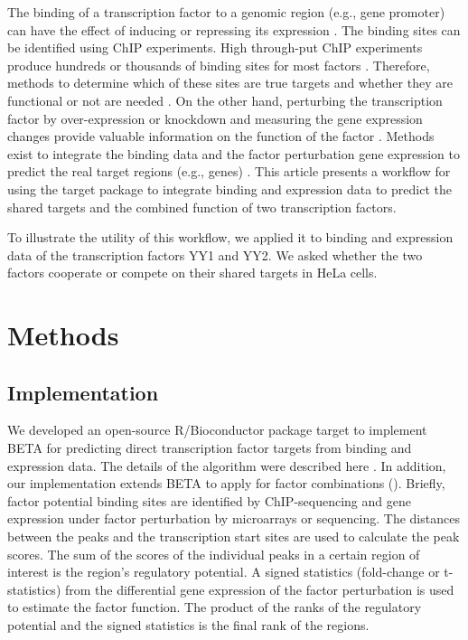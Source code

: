 \documentclass[9pt,a4paper,]{extarticle}
\begin{document}
The binding of a transcription factor to a genomic region (e.g., gene promoter) can have the effect of inducing or repressing its expression \citet{Latchman2001}. The binding sites can be identified using ChIP experiments. High through-put ChIP experiments produce hundreds or thousands of binding sites for most factors \citet{Johnson2007a}. Therefore, methods to determine which of these sites are true targets and whether they are functional or not are needed \citet{Ucar2009}. On the other hand, perturbing the transcription factor by over-expression or knockdown and measuring the gene expression changes provide valuable information on the function of the factor \citet{Tran2005}. Methods exist to integrate the binding data and the factor perturbation gene expression to predict the real target regions (e.g., genes) \citep{Subramanian2005, Wang2013b}. This article presents a workflow for using the target package to integrate binding and expression data to predict the shared targets and the combined function of two transcription factors.

To illustrate the utility of this workflow, we applied it to binding and expression data of the transcription factors YY1 and YY2. We asked whether the two factors cooperate or compete on their shared targets in HeLa cells.

\hypertarget{methods}{%
\section{Methods}\label{methods}}

\hypertarget{implementation}{%
\subsection{Implementation}\label{implementation}}

We developed an open-source R/Bioconductor package target to implement BETA for predicting direct transcription factor targets from binding and expression data. The details of the algorithm were described here \citet{Wang2013b}. In addition, our implementation extends BETA to apply for factor combinations (\citet{Ahmed2020}). Briefly, factor potential binding sites are identified by ChIP-sequencing and gene expression under factor perturbation by microarrays or sequencing. The distances between the peaks and the transcription start sites are used to calculate the peak scores. The sum of the scores of the individual peaks in a certain region of interest is the region's regulatory potential. A signed statistics (fold-change or t-statistics) from the differential gene expression of the factor perturbation is used to estimate the factor function. The product of the ranks of the regulatory potential and the signed statistics is the final rank of the regions.
\end{document}
